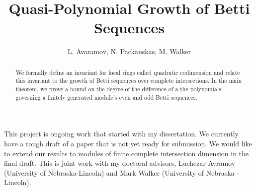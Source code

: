 \documentclass{amsart}
\theoremstyle{definition}
\theoremstyle{remark}
\numberwithin{equation}{section}
\begin{document}
\title{Quasi-Polynomial Growth of Betti Sequences}
\author{L. Avaramov, N. Packauskas, M. Walker}


\begin{abstract}
	We formally define an invariant for local rings called quadratic codimension and relate this invariant to the growth of Betti sequences over complete intersections.  In the main theorem, we prove a bound on the degree of the difference of a the polynomials governing a finitely generated module's even and odd Betti sequences. 
\end{abstract}


\maketitle

This project is ongoing work that started with my dissertation. We currently have a rough draft of a paper that is not yet ready for submission. We would like to extend our results to modules of finite complete intersection dimension in the final draft.  This is joint work with my doctoral advisors, Luchezar Avramov (University of Nebraska-Lincoln) and Mark Walker (University of Nebraska - Lincoln).
\end{document}
